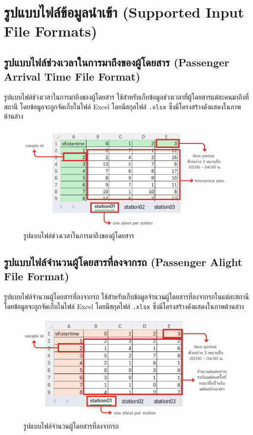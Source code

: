 \section{รูปแบบไฟล์ข้อมูลนำเข้า (Supported Input File Formats)}
  \subsection{รูปแบบไฟล์ช่วงเวลาในการมาถึงของผู้โดยสาร (Passenger Arrival Time File Format)}
  \begin{mypara}
      \indent รูปแบบไฟล์ช่วงเวลาในการมาถึงของผู้โดยสาร ใช้สำหรับเก็บข้อมูลช่วงเวลาที่ผู้โดยสารแต่ละคนมาถึงที่สถานี
      โดยข้อมูลจะถูกจัดเก็บในไฟล์ Excel โดยมีสกุลไฟล์ \texttt{.xlsx} 
      ซึ่งมีโครงสร้างดังแสดงในภาพด้านล่าง
      \begin{figure}[H]
        \centering
        \includegraphics[scale=0.5]{Passenger_Interarrival.png}
        \caption{รูปแบบไฟล์ช่วงเวลาในการมาถึงของผู้โดยสาร}
        \label{fig:PassengerArrivalFileFormat}
      \end{figure}
  \end{mypara}

  \newpage
  \subsection{รูปแบบไฟล์จำนวนผู้โดยสารที่ลงจากรถ (Passenger Alight File Format)}
  \begin{mypara}
      \indent รูปแบบไฟล์จำนวนผู้โดยสารที่ลงจากรถ ใช้สำหรับเก็บข้อมูลจำนวนผู้โดยสารที่ลงจากรถในแต่ละสถานี
      โดยข้อมูลจะถูกจัดเก็บในไฟล์ Excel โดยมีสกุลไฟล์ \texttt{.xlsx} 
      ซึ่งมีโครงสร้างดังแสดงในภาพด้านล่าง
      \begin{figure}[H]
        \centering
        \includegraphics[scale=0.5]{Passenger_alighting.png}
        \caption{รูปแบบไฟล์จำนวนผู้โดยสารที่ลงจากรถ}
        \label{fig:PassengerAlightFileFormat}
      \end{figure}
  \end{mypara}


